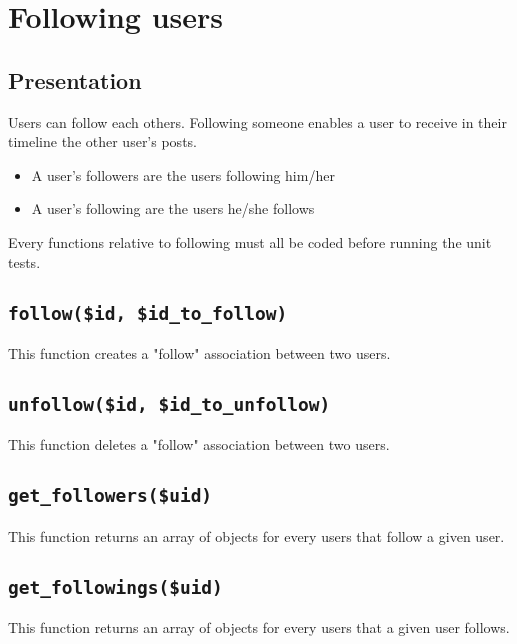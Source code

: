 \documentclass[twoside,a4paper,12pt]{article}
\begin{document}
\section{Following users}

\subsection{Presentation}
Users can follow each others. Following someone enables a user to receive in their timeline the other user's posts.

\begin{itemize}
\item A user's followers are the users following him/her
\item A user's following are the users he/she follows
\end{itemize}

Every functions relative to following must all be coded before running the unit tests. 

\subsection{\texttt{follow(\$id, \$id\_to\_follow)}}
This function creates a "follow" association between two users.

\subsection{\texttt{unfollow(\$id, \$id\_to\_unfollow)}}
This function deletes a "follow" association between two users.

\subsection{\texttt{get\_followers(\$uid)}}
This function returns an array of objects for every users that follow a given user.

\subsection{\texttt{get\_followings(\$uid)}}
This function returns an array of objects for every users that a given user follows.
\end{document}

